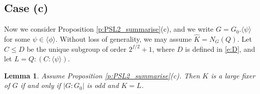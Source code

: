 \documentclass[twoside,a4paper,reqno,11pt]{amsart}
\newcommand{\<}{\langle}
\renewcommand{\>}{\rangle}
\newcommand{\la}{\langle}
\newcommand{\ra}{\rangle}
\newcommand{\leqs}{\leqslant}
\newtheorem{lem}[thm]{Lemma}
\theoremstyle{definition}
\begin{document}
	
	
	
	\subsection{Case (c)}
	
	Now we consider Proposition \ref{p:PSL2_summarise}(c), and we write $G = G_0.\la\psi\ra$ for some $\psi\in\la\phi\ra$. Without loss of generality, we may assume $\widehat{K} = N_G(Q)$. Let $C\leqs D$ be the unique subgroup of order $2^{f/2}+1$, where $D$ is defined in \eqref{e:D}, and let $L = Q{:}(C{:}\la\psi\ra)$.
	
	
	\begin{lem}
		\label{l:PSL2_(c)}
		Assume Proposition \ref{p:PSL2_summarise}(c). Then $K$ is a large fixer of $G$ if and only if $|G:G_0|$ is odd and $K = L$.
	\end{lem}
	
\end{document}
